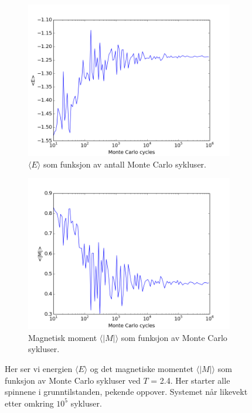 \documentclass[11pt,a4paper]{article}
\begin{document}
\FloatBarrier
\begin{figure}[!ht]
\centering
\begin{subfigure}{.55\textwidth}
  \centering
  \includegraphics[width=1.1\linewidth]{4cT24upE.png}
  \caption{$\langle E \rangle$ som funksjon av antall Monte Carlo sykluser. }
  \label{e3}
\end{subfigure}%
\begin{subfigure}{.55\textwidth}
  \centering
  \includegraphics[width=1.1\linewidth]{4cT24upM.png}
  \caption{Magnetisk moment $\langle |M| \rangle$ som funksjon av Monte Carlo sykluser. }
  \label{m3}
\end{subfigure}
\caption{Her ser vi energien $\langle E \rangle$ og det magnetiske momentet $\langle |M| \rangle$ som funksjon av Monte Carlo sykluser ved $T$ = 2.4. Her starter alle spinnene i grunntilstanden, pekende oppover. Systemet når likevekt etter omkring $10^5$ sykluser.}
\label{fig:T24up}
\end{figure}
\FloatBarrier
\end{document}
